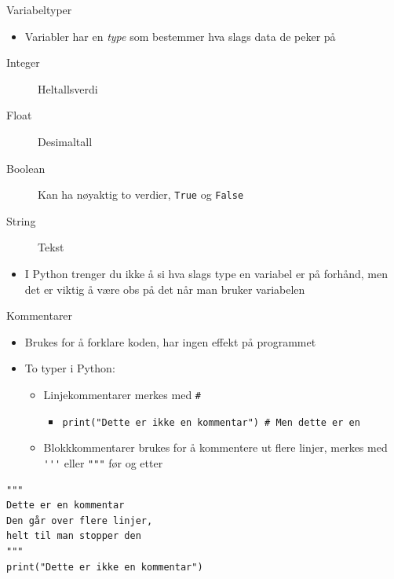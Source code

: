 \documentclass[screen, aspectratio=169]{beamer}
\begin{document}
\begin{frame}{Variabeltyper}
	\begin{itemize}
		\item Variabler har en \emph{type} som bestemmer hva slags data de peker på
	\end{itemize}
	\begin{description}
		\item[Integer] Heltallsverdi
		\item[Float] Desimaltall
		\item[Boolean] Kan ha nøyaktig to verdier, \lstinline|True| og \lstinline|False|
		\item[String] Tekst
	\end{description}
	\begin{itemize}
		\item I Python trenger du ikke å si hva slags type en variabel er på forhånd, men det er viktig å være obs på det når man bruker variabelen
	\end{itemize}
\end{frame}


\begin{frame}[fragile]{Kommentarer}
	\begin{itemize}
		\item Brukes for å forklare koden, har ingen effekt på programmet
		\item To typer i Python:
		\begin{itemize}
			\item Linjekommentarer merkes med \lstinline|#|
			\begin{itemize}
				\item \lstinline|print("Dette er ikke en kommentar") # Men dette er en|
			\end{itemize}
			\item Blokkkommentarer brukes for å kommentere ut flere linjer, merkes med \lstinline|'''| eller \lstinline|"""| før og etter
		\end{itemize}
	\end{itemize}
	\begin{lstlisting}
"""
Dette er en kommentar
Den går over flere linjer,
helt til man stopper den
"""
print("Dette er ikke en kommentar")
	\end{lstlisting}
\end{frame}
\end{document}
